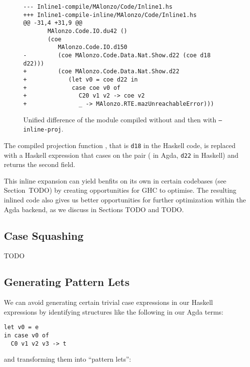 \begin{figure}
\begin{verbatim}
--- Inline1-compile/MAlonzo/Code/Inline1.hs
+++ Inline1-compile-inline/MAlonzo/Code/Inline1.hs
@@ -31,4 +31,9 @@
       MAlonzo.Code.IO.du42 ()
       (coe
          MAlonzo.Code.IO.d150
-         (coe MAlonzo.Code.Data.Nat.Show.d22 (coe d18 d22)))
+         (coe MAlonzo.Code.Data.Nat.Show.d22
+            (let v0 = coe d22 in
+             case coe v0 of
+               C20 v1 v2 -> coe v2
+               _ -> MAlonzo.RTE.mazUnreachableError)))
\end{verbatim}

\caption{Unified difference of the  module compiled without and then with \texttt{--inline-proj}.}
\label{fig:inline1_diff}
\end{figure}

The compiled projection function , that is \lstinline{d18} in the Haskell code, is replaced with a Haskell expression that cases on the pair ( in Agda, \lstinline{d22} in Haskell) and returns the second field.

This inline expansion can yield benfits on its own in certain codebases (see Section~TODO) by creating opportunities for GHC to optimise. The resulting inlined code also gives us better opportunities for further optimization within the Agda backend, as we discuss in Sections TODO and TODO.

\subsection{Case Squashing}

TODO

\subsection{Generating Pattern Lets}

We can avoid generating certain trivial case expressions in our Haskell expressions by identifying structures like the following in our Agda terms:

\begin{lstlisting}
let v0 = e
in case v0 of
  C0 v1 v2 v3 -> t
\end{lstlisting}

and transforming them into ``pattern lets'':

